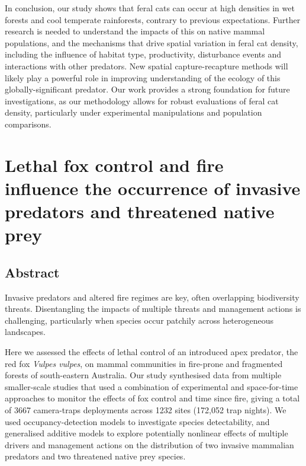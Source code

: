 \documentclass[11pt,a4paper,titlepage,twoside,openright]{style/unimelbthesis}
\begin{document}
\begin{mainmatter}
In conclusion, our study shows that feral cats can occur at high densities in wet forests and cool temperate rainforests, contrary to previous expectations. Further research is needed to understand the impacts of this on native mammal populations, and the mechanisms that drive spatial variation in feral cat density, including the influence of habitat type, productivity, disturbance events and interactions with other predators. New spatial capture-recapture methods will likely play a powerful role in improving understanding of the ecology of this globally-significant predator. Our work provides a strong foundation for future investigations, as our methodology allows for robust evaluations of feral cat density, particularly under experimental manipulations and population comparisons.

\hypertarget{occ}{%
\chapter{Lethal fox control and fire influence the occurrence of invasive predators and threatened native prey}\label{occ}}

\hypertarget{abstract-1}{%
\section*{Abstract}\label{abstract-1}}

Invasive predators and altered fire regimes are key, often overlapping biodiversity threats. Disentangling the impacts of multiple threats and management actions is challenging, particularly when species occur patchily across heterogeneous landscapes.

Here we assessed the effects of lethal control of an introduced apex predator, the red fox \emph{Vulpes vulpes}, on mammal communities in fire-prone and fragmented forests of south-eastern Australia. Our study synthesised data from multiple smaller-scale studies that used a combination of experimental and space-for-time approaches to monitor the effects of fox control and time since fire, giving a total of 3667 camera-traps deployments across 1232 sites (172,052 trap nights). We used occupancy-detection models to investigate species detectability, and generalised additive models to explore potentially nonlinear effects of multiple drivers and management actions on the distribution of two invasive mammalian predators and two threatened native prey species.


\end{mainmatter}
\end{document}
